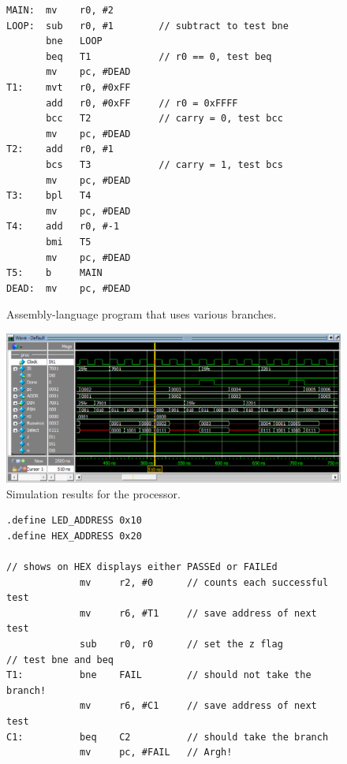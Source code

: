 \documentclass[epsfig,10pt,fullpage]{article} \addtolength{\textwidth}{1.5in}
\begin{document}
\begin{enumerate}
\lstset{language=ASM,numbers=none,escapechar=|}
\begin{figure}[H]
\begin{center}
\begin{minipage}[h]{13.5 cm}
\begin{lstlisting}[name=proc]
MAIN:  mv    r0, #2
LOOP:  sub   r0, #1        // subtract to test bne
       bne   LOOP
       beq   T1            // r0 == 0, test beq
       mv    pc, #DEAD
T1:    mvt   r0, #0xFF
       add   r0, #0xFF     // r0 = 0xFFFF
       bcc   T2            // carry = 0, test bcc
       mv    pc, #DEAD
T2:    add   r0, #1
       bcs   T3            // carry = 1, test bcs
       mv    pc, #DEAD
T3:    bpl   T4
       mv    pc, #DEAD
T4:    add   r0, #-1
       bmi   T5
       mv    pc, #DEAD
T5:    b     MAIN
DEAD:  mv    pc, #DEAD
\end{lstlisting}
\end{minipage}
\caption{Assembly-language program that uses various branches.}
\label{fig:branches}
\end{center}
\end{figure}

\begin{figure}[H]
	\begin{center}
		\includegraphics[width=\textwidth]{figures/part5.png}
	\end{center}
	\caption{Simulation results for the processor.}
	\label{fig:part5}
\end{figure}

\begin{figure}[H]
\begin{center}
\begin{minipage}[h]{14 cm}
\begin{lstlisting}[name=proc]
.define LED_ADDRESS 0x10
.define HEX_ADDRESS 0x20

// shows on HEX displays either PASSEd or FAILEd
             mv     r2, #0      // counts each successful test
             mv     r6, #T1     // save address of next test
             sub    r0, r0      // set the z flag
// test bne and beq
T1:          bne    FAIL        // should not take the branch!
             mv     r6, #C1     // save address of next test
C1:          beq    C2          // should take the branch
             mv     pc, #FAIL   // Argh!


\end{lstlisting}
\end{minipage}
\end{center}
\end{figure}
\end{enumerate}
\end{document}
